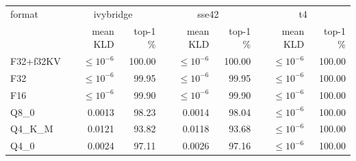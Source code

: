 \begin{tabular}{lrrrrrr}
\toprule
format & \multicolumn{2}{c}{ivybridge} & \multicolumn{2}{c}{sse42} & \multicolumn{2}{c}{t4}\\
 & mean KLD & top-1 \% & mean KLD & top-1 \% & mean KLD & top-1 \%\\
\midrule
F32+f32KV & $\le 10^{-6}$ & 100.00 & $\le 10^{-6}$ & 100.00 & $\le 10^{-6}$ & 100.00\\
F32 & $\le 10^{-6}$ & 99.95 & $\le 10^{-6}$ & 99.95 & $\le 10^{-6}$ & 100.00\\
F16 & $\le 10^{-6}$ & 99.90 & $\le 10^{-6}$ & 99.90 & $\le 10^{-6}$ & 100.00\\
Q8\_0 & 0.0013 & 98.23 & 0.0014 & 98.04 & $\le 10^{-6}$ & 100.00\\
Q4\_K\_M & 0.0121 & 93.82 & 0.0118 & 93.68 & $\le 10^{-6}$ & 100.00\\
Q4\_0 & 0.0024 & 97.11 & 0.0026 & 97.16 & $\le 10^{-6}$ & 100.00\\
\bottomrule
\end{tabular}
